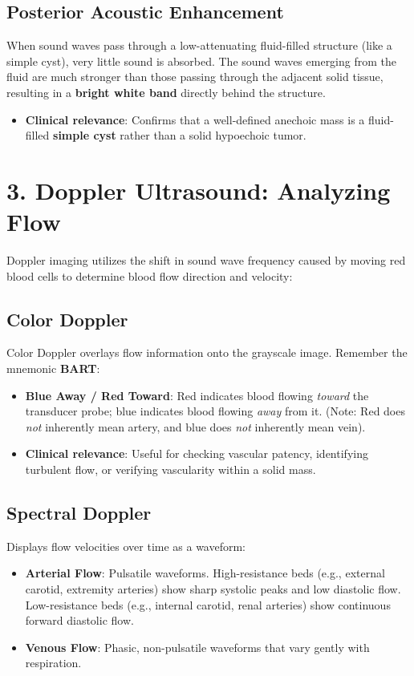 \subsection*{Posterior Acoustic Enhancement}
When sound waves pass through a low-attenuating fluid-filled structure (like a simple cyst), very little sound is absorbed. The sound waves emerging from the fluid are much stronger than those passing through the adjacent solid tissue, resulting in a \textbf{bright white band} directly behind the structure.
\begin{itemize}
    \item \textbf{Clinical relevance}: Confirms that a well-defined anechoic mass is a fluid-filled \textbf{simple cyst} rather than a solid hypoechoic tumor.
\end{itemize}


\section*{3. Doppler Ultrasound: Analyzing Flow}
Doppler imaging utilizes the shift in sound wave frequency caused by moving red blood cells to determine blood flow direction and velocity:

\subsection*{Color Doppler}
Color Doppler overlays flow information onto the grayscale image. Remember the mnemonic \textbf{BART}:
\begin{itemize}
    \item \textbf{Blue Away / Red Toward}: Red indicates blood flowing \emph{toward} the transducer probe; blue indicates blood flowing \emph{away} from it. (Note: Red does \emph{not} inherently mean artery, and blue does \emph{not} inherently mean vein).
    \item \textbf{Clinical relevance}: Useful for checking vascular patency, identifying turbulent flow, or verifying vascularity within a solid mass.
\end{itemize}

\subsection*{Spectral Doppler}
Displays flow velocities over time as a waveform:
\begin{itemize}
    \item \textbf{Arterial Flow}: Pulsatile waveforms. High-resistance beds (e.g., external carotid, extremity arteries) show sharp systolic peaks and low diastolic flow. Low-resistance beds (e.g., internal carotid, renal arteries) show continuous forward diastolic flow.
    \item \textbf{Venous Flow}: Phasic, non-pulsatile waveforms that vary gently with respiration.
\end{itemize}


